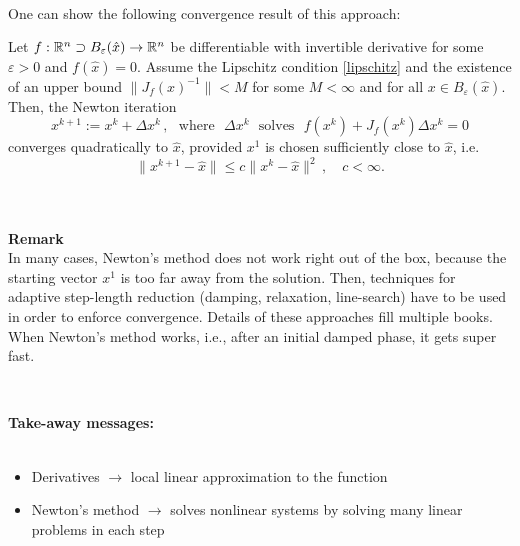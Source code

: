 \begin{frame}
~\\
One can show the following convergence result of this approach:
\begin{theorem}
	Let $f:{\mathbb{R}}^n\supset B_\varepsilon(\hat{x})\to{\mathbb{R}}^n$ be differentiable with invertible derivative for some $\varepsilon>0$ and $f(\hat{x})=0$. Assume the Lipschitz condition \eqref{lipschitz} and the existence of an upper bound $\|J_f(x)^{-1}\|<M$ for some $M<\infty$ and for all $x\in B_\varepsilon(\hat{x})$. Then, the Newton iteration
	\[
	\boxed{x^{k+1}:=x^k+\Delta x^k\, , \text{~ where~ }\Delta x^k\text{~ solves~ }f(x^k)+J_f(x^k)\Delta x^k=0}
	\]
	converges quadratically to $\hat{x}$, provided $x^1$ is chosen sufficiently close to $\hat{x}$, i.e.
	\[
	\|x^{k+1}-\hat{x}\|\le c \|x^{k}-\hat{x}\|^2\, ,\quad c<\infty.
	\]
\end{theorem}

~\\~\\
\textbf{Remark}\\
In many cases, Newton's method does not work right out of the box, because the starting vector $x^1$ is too far away from the solution. Then, techniques for adaptive step-length reduction (damping, relaxation, line-search) have to be used in order to enforce convergence. Details of these approaches fill multiple books. When Newton's method works, i.e., after an initial damped phase, it gets super fast.
\end{frame}



\begin{frame}[c]
~\\
{
\textbf{Take-away messages:}\\~\\
\begin{itemize}
	\item Derivatives $\rightarrow$ local linear approximation to the function
	\item Newton's method $\rightarrow$ solves nonlinear systems by solving many linear problems in each step
\end{itemize}
}

\end{frame}

